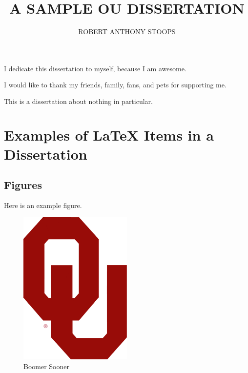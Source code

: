 \documentclass[letter,12pt,dissertation]{OUdissertation}
\begin{document}
\title{A SAMPLE OU DISSERTATION}
\author{ROBERT ANTHONY STOOPS}
\begin{preface}
I dedicate this dissertation to myself, because I am awesome.


I would like to thank my friends, family, fans, and pets for supporting me.

\tableofcontents
\listoftables
\listoffigures
{}

This is a dissertation about nothing in particular.

\end{preface}
\chapter{Examples of LaTeX Items in a Dissertation}
\label{intro}

\section{Figures}
\label{figures}

Here is an example figure.

\begin{figure}[h]
\centering
\includegraphics[width=0.5\textwidth]{oulogo.png}
\caption{Boomer Sooner}
\label{fig:oulogo}
\end{figure}
\end{document}
